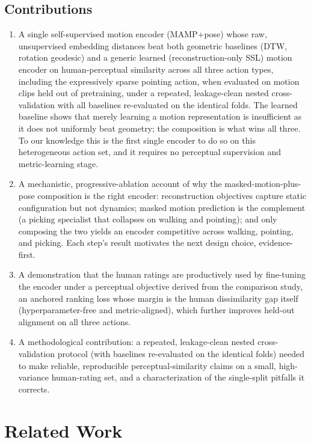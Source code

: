 \documentclass[letterpaper]{article} %
\begin{document}
\subsection{Contributions}
\begin{enumerate}
\item A {single self-supervised motion encoder (MAMP+pose)} whose {raw,
unsupervised} embedding distances beat both geometric baselines (DTW, rotation geodesic)
{and a generic learned (reconstruction-only SSL) motion encoder} on human-perceptual
similarity across all three action types, including the expressively sparse pointing
action, when evaluated on motion clips held out of pretraining, under a repeated, leakage-clean
nested cross-validation with all baselines re-evaluated on the identical folds. The learned
baseline shows that {merely} learning a motion representation is insufficient as it does not
uniformly beat geometry; the composition is what wins all three. To our knowledge this is the
first single encoder to do so on this heterogeneous action set, and it requires {no
perceptual supervision and metric-learning stage}.
\item A {mechanistic, progressive-ablation account} of {why} the
masked-motion-plus-pose composition is the right encoder: reconstruction objectives capture
static configuration but not dynamics; masked motion prediction is the complement (a picking
specialist that collapses on walking and pointing); and only composing the two yields an encoder
competitive across walking, pointing, and picking. Each step's result motivates the next design
choice, evidence-first.
\item A demonstration that the human ratings are productively used by {fine-tuning the
encoder} under a perceptual objective derived from the comparison study, an {anchored
ranking loss whose margin is the human dissimilarity gap itself} (hyperparameter-free and
metric-aligned), which further improves held-out alignment on all three actions.
\item A {methodological contribution}: a repeated, leakage-clean nested cross-validation
protocol (with baselines re-evaluated on the identical folds) needed to make reliable,
reproducible perceptual-similarity claims on a small, high-variance human-rating set, and a
characterization of the single-split pitfalls it corrects.
\end{enumerate}

\section{Related Work}
\label{sec:related}
\end{document}
